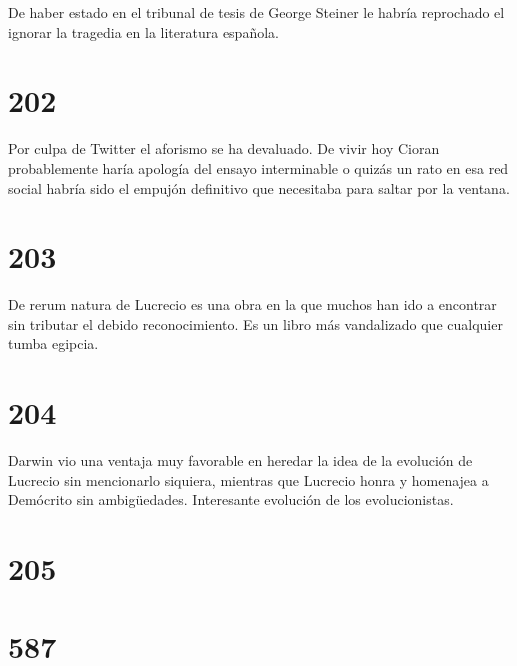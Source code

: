 \documentclass[a4paper,11pt,openright,twocolumn]{book}
\begin{document}
De haber estado en el tribunal de tesis de George Steiner le habría reprochado
el ignorar la tragedia en la literatura española.

\section*{202}

Por culpa de Twitter el aforismo se ha devaluado. De vivir hoy Cioran probablemente
haría apología del ensayo interminable o quizás un rato en esa red social habría
sido el empujón definitivo que necesitaba para saltar por la ventana. 

\section*{203}

De rerum natura de Lucrecio es una obra en la que muchos han ido a encontrar
sin tributar el debido reconocimiento. Es un libro más vandalizado que cualquier
tumba egipcia.

\section*{204}

Darwin vio una ventaja muy favorable en heredar la idea de la evolución de Lucrecio sin mencionarlo
siquiera, mientras que Lucrecio honra y homenajea a Demócrito sin ambigüedades.
Interesante evolución de los evolucionistas.

\section*{205}


\section*{587}
\end{document}
